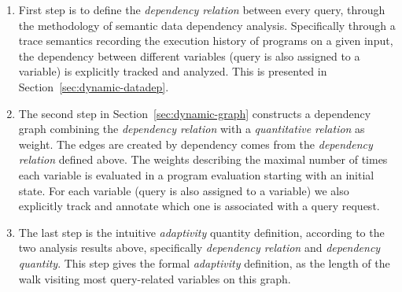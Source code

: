 \begin{enumerate}
 \item First step is to define the \emph{dependency relation} between every query, 
 through the methodology of semantic data dependency analysis.
 Specifically through a trace semantics recording the execution history of programs on a given input,
 the dependency between different variables (query is also assigned to a variable) is explicitly tracked and 
 analyzed. This is presented in Section~\ref{sec:dynamic-datadep}.
 \item The second step in Section~\ref{sec:dynamic-graph} constructs a dependency graph combining the \emph{dependency relation}
with a \emph{quantitative relation} as weight. %
 The edges are created by dependency comes from the \emph{dependency relation} defined above.
 The weights describing the maximal number of times each variable is evaluated in a program evaluation starting with an initial state. 
 For each variable (query is also assigned to a variable) 
 we also explicitly track and annotate which one is associated with a query request. 

 \item The last step is the intuitive \emph{adaptivity} quantity definition, 
 according to the two analysis results above, specifically \emph{dependency relation} and \emph{dependency quantity}.
 This step 
 gives the formal \emph{adaptivity} definition, as the length of the walk visiting most query-related variables on this graph. 
 \end{enumerate}
